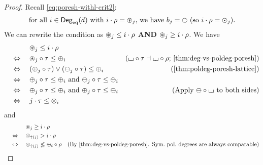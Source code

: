 \documentclass[a4paper]{memoir}
\begin{document}
\begin{proof}
	Recall \cref{eq:poresh-withl-crit2}:
	\begin{align*}
		\text{for all } i \in \Degeq(\vec a) \text{ with } i \cdot \rho = \isopol_j \text{, we have } b_j = \npolar \text{ (so $i \cdot \rho = \nonpol_j$)}.
	\end{align*}
	We can rewrite the condition as ${\oast}_j \leq i \cdot \rho$ \textbf{AND} ${\oast}_j \geq i \cdot \rho$.
	We have
	\begin{align*}
		&\quad\mathrel{\phantom{\Leftrightarrow}}\quad
		\isopol_j \leq i \cdot \rho
		\\ &\quad\Leftrightarrow\quad
		\isopol_j \circ \tau \leq \pospol_i
		& \text{($\loch \circ \tau \dashv \loch \circ \rho$; \cref{thm:deg-vs-poldeg-poresh})}
		\\ &\quad\Leftrightarrow\quad
		(\pospol_j \circ \tau) \vee (\negpol_j \circ \tau) \leq \pospol_i
		& \text{(\Cref{thm:poldeg-poresh-lattice})}
		\\ &\quad\Leftrightarrow\quad
		\pospol_j \circ \tau \leq \pospol_i \text{ and }
		\negpol_j \circ \tau \leq \pospol_i
		\\ &\quad\Leftrightarrow\quad
		\pospol_j \circ \tau \leq \pospol_i \text{ and }
		\pospol_j \circ \tau \leq \negpol_i
		& \text{(Apply $\negpol \circ \loch$ to both sides)}
		\\ &\quad\Leftrightarrow\quad
		j \cdot \tau \leq \mixpol_i
	\end{align*}
	and
	\begin{align*}
		&\quad\mathrel{\phantom{\Leftrightarrow}}\quad
		\isopol_j \geq i \cdot \rho
		\\ &\quad\Leftrightarrow\quad
		\mixpol_{\sucdeg(j)} > i \cdot \rho
		\\ &\quad\Leftrightarrow\quad
		\mixpol_{\sucdeg(j)} \not\leq \pospol_i \circ \rho
		& \text{(By \cref{thm:deg-vs-poldeg-poresh}. Sym.\ pol.\ degrees are always comparable)}

\end{align*}
\end{proof}
\end{document}
